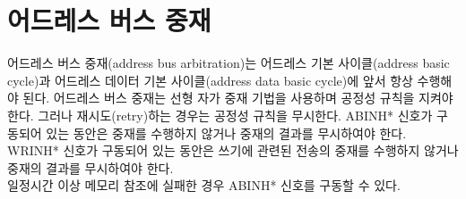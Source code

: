 \section{어드레스 버스 중재}
어드레스 버스 중재(address bus arbitration)는
어드레스 기본 사이클(address basic cycle)과
어드레스 데이터 기본 사이클(address data basic cycle)에 앞서 항상 수행해야 된다.
어드레스 버스 중재는 선형 자가 중재 기법을 사용하며 공정성 규칙을 지켜야 한다.
그러나 재시도(retry)하는 경우는 공정성 규칙을 무시한다.
ABINH* 신호가 구동되어 있는 동안은 중재를 수행하지 않거나 중재의 결과를 무시하여야 한다.
WRINH* 신호가 구동되어 있는 동안은 쓰기에 관련된 전송의
중재를 수행하지 않거나 중재의 결과를 무시하여야 한다. \\
일정시간 이상 메모리 참조에 실패한 경우 ABINH* 신호를 구동할 수 있다.
%
